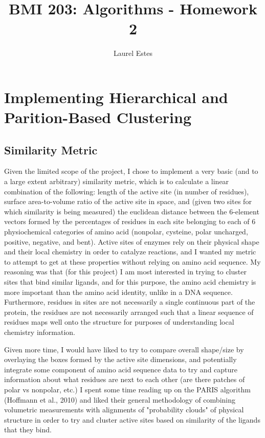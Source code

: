 \documentclass{article}
\begin{document}
\title{BMI 203: Algorithms - Homework 2}
\author{Laurel Estes}
\maketitle
\section{Implementing Hierarchical and Parition-Based Clustering}
\subsection{Similarity Metric}
Given the limited scope of the project, I chose to implement a very basic (and to a large extent arbitrary) similarity metric, which is to calculate a linear combination of the following: length of the active site (in number of residues), surface area-to-volume ratio of the active site in space, and (given two sites for which similarity is being measured) the euclidean distance between the 6-element vectors formed by the percentages of residues in each site belonging to each of 6 physiochemical categories of amino acid (nonpolar, cysteine, polar uncharged, positive, negative, and bent). Active sites of enzymes rely on their physical shape and their local chemistry in order to catalyze reactions, and I wanted my metric to attempt to get at these properties without relying on amino acid sequence. My reasoning was that (for this project) I am most interested in trying to cluster sites that bind similar ligands, and for this purpose, the amino acid chemistry is more important than the amino acid identity, unlike in a DNA sequence. Furthermore, residues in sites are not necessarily a single continuous part of the protein, the residues are not necessarily arranged such that a linear sequence of residues maps well onto the structure for purposes of understanding local chemistry information. \par
Given more time, I would have liked to try to compare overall shape/size by overlaying the boxes formed by the active site dimensions, and potentially integrate some component of amino acid sequence data to try and capture information about what residues are next to each other (are there patches of polar vs nonpolar, etc.) I spent some time reading up on the PARIS algorithm (Hoffmann et al., 2010) and liked their general methodology of combining volumetric measurements with alignments of "probability clouds" of physical structure in order to try and cluster active sites based on similarity of the ligands that they bind. 
\end{document}
